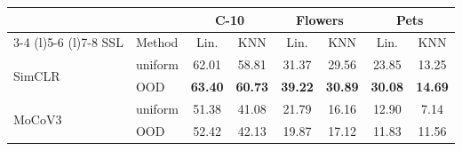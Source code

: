 \centering
\setlength{\tabcolsep}{2pt}
\caption{\centering Sample Selection\\(ViT-B, SimCLR, ImageNet-100-LT)}
{\begin{tabular}{ll cc cc cc}
    \toprule
     && \multicolumn{2}{c}{\textbf{C-10}} &  \multicolumn{2}{c}{\textbf{Flowers}} &  \multicolumn{2}{c}{\textbf{Pets}} \\
     \cmidrule(r){3-4}
     \cmidrule(l){5-6}
     \cmidrule(l){7-8}
    SSL & Method & Lin. & KNN & Lin. & KNN & Lin. & KNN \\
    \midrule
    \multirow{2}{*}{SimCLR} & uniform     & 62.01   & 58.81  & 31.37 & 29.56 & 23.85 & 13.25 \\
    & OOD     & \textbf{63.40} & \textbf{60.73} & \textbf{39.22} & \textbf{30.89} & \textbf{30.08} & \textbf{14.69}\\
    \midrule
    \multirow{2}{*}{MoCoV3} & uniform     & 51.38   & 41.08  & 21.79 & 16.16 & 12.90 & 7.14 \\
    & OOD     & 52.42 & 42.13 & 19.87 & 17.12 & 11.83 & 11.56 \\
    \bottomrule
\end{tabular}
\label{table:sample_selection}}
